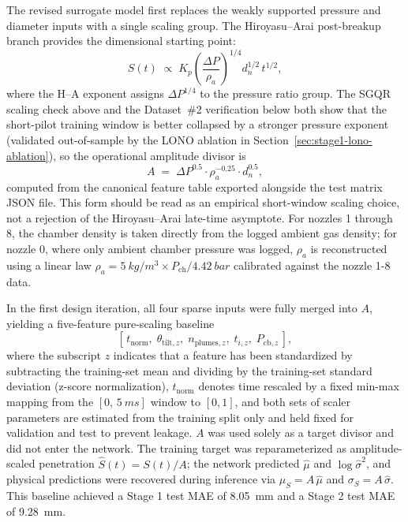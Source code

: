 The revised surrogate model first replaces the weakly supported pressure and diameter inputs with a single scaling group. The Hiroyasu--Arai post-breakup branch \cite{HiroyasuArai1990} provides the dimensional starting point:
\[
S(t)\;\propto\;K_p\!\left(\frac{\Delta P}{\rho_a}\right)^{1/4}d_n^{1/2}\,t^{1/2},
\]
where the H--A exponent assigns \(\Delta P^{1/4}\) to the pressure ratio group. The SGQR scaling check above and the Dataset~\#2 verification below both show that the short-pilot training window is better collapsed by a stronger pressure exponent (validated out-of-sample by the LONO ablation in Section~\ref{sec:stage1-lono-ablation}), so the operational amplitude divisor is
\[
A\;=\;\Delta P^{0.5}\cdot\rho_a^{-0.25}\cdot d_n^{0.5},
\]
computed from the canonical feature table exported alongside the test matrix JSON file. This form should be read as an empirical short-window scaling choice, not a rejection of the Hiroyasu--Arai late-time asymptote. For nozzles 1 through 8, the chamber density is taken directly from the logged ambient gas density; for nozzle 0, where only ambient chamber pressure was logged, \(\rho_a\) is reconstructed using a linear law \(\rho_a=\SI{5}{kg/m^3}\times P_{\mathrm{ch}}/\SI{4.42}{bar}\) calibrated against the nozzle 1-8 data.

In the first design iteration, all four sparse inputs were fully merged into $A$, yielding a five-feature pure-scaling baseline
\[
[\,t_{\mathrm{norm}},\;\theta_{\mathrm{tilt},z},\;n_{\mathrm{plumes},z},\;t_{i,z},\;P_{\mathrm{cb},z}\,],
\]
where the subscript $z$ indicates that a feature has been standardized by subtracting the training-set mean and dividing by the training-set standard deviation (z-score normalization), $t_{\mathrm{norm}}$ denotes time rescaled by a fixed min-max mapping from the $[0,\,\SI{5}{ms}]$ window to $[0,1]$, and both sets of scaler parameters are estimated from the training split only and held fixed for validation and test to prevent leakage.
$A$ was used solely as a target divisor and did not enter the network. The training target was reparameterized as amplitude-scaled penetration $\hat{S}(t)=S(t)/A$; the network predicted $\hat{\mu}$ and $\log\hat{\sigma}^2$, and physical predictions were recovered during inference via $\mu_S=A\,\hat{\mu}$ and $\sigma_S=A\,\hat{\sigma}$. This baseline achieved a Stage 1 test MAE of \SI{8.05}{mm} and a Stage 2 test MAE of \SI{9.28}{mm}.

